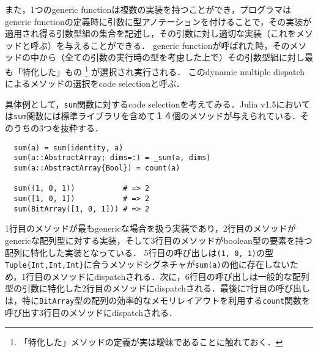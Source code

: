 また，1つのgeneric functionは複数の実装を持つことができ，プログラマはgeneric functionの定義時に引数に型アノテーションを付けることで，その実装が適用され得る引数型組の集合を記述し，その引数に対し適切な実装（これをメソッドと呼ぶ）を与えることができる．
generic functionが呼ばれた時，そのメソッドの中から（全ての引数の実行時の型を考慮した上で）その引数型組に対し最も「特化した」もの
\footnote{
  「特化した」メソッドの定義が実は曖昧であることに触れておく．
}
が選択され実行される．
このdynamic multiple dispatchによるメソッドの選択をcode selectionと呼ぶ．

具体例として，\texttt{sum}関数に対するcode selectionを考えてみる．Julia v1.5においては\texttt{sum}関数には標準ライブラリを含めて１４個のメソッドが与えられている．そのうちの3つを抜粋する．

\begin{verbatim}
  sum(a) = sum(identity, a)
  sum(a::AbstractArray; dims=:) = _sum(a, dims)
  sum(a::AbstractArray{Bool}) = count(a)

  sum((1, 0, 1))           # => 2
  sum([1, 0, 1])           # => 2
  sum(BitArray([1, 0, 1])) # => 2
\end{verbatim}

1行目のメソッドが最もgenericな場合を扱う実装であり，2行目のメソッドがgenericな配列型に対する実装，そして3行目のメソッドがboolean型の要素を持つ配列に特化した実装となっている．
5行目の呼び出しは\texttt{(1, 0, 1)}の型\texttt{Tuple\{Int,Int,Int\}}に合うメソッドシグネチャが\texttt{sum(a)}の他に存在しないため，1行目のメソッドにdispatchされる．次に，6行目の呼び出しは一般的な配列型の引数に特化した2行目のメソッドにdispatchされる．最後に7行目の呼び出しは，特に\texttt{BitArray}型の配列の効率的なメモリレイアウトを利用する\texttt{count}関数を呼び出す3行目のメソッドにdispatchされる．

